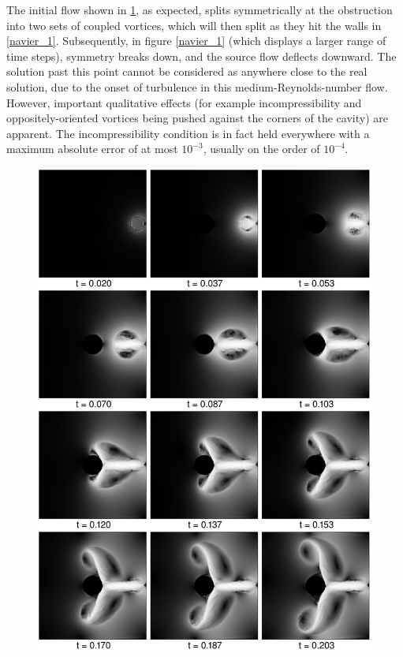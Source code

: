 The initial flow shown in \ref{navier_0}, as expected, splits symmetrically at the obstruction into two sets of coupled vortices, which will then split as they hit the walls in \ref{navier_1}.
Subsequently, in figure \ref{navier_1} (which displays a larger range of time steps), symmetry breaks down, and the source flow deflects downward.
The solution past this point cannot be considered as anywhere close to the real solution, due to the onset of turbulence in this medium-Reynolds-number flow. However, important qualitative effects
(for example incompressibility and oppositely-oriented vortices being pushed against the corners of the cavity) are apparent. The incompressibility condition is
in fact held everywhere with a maximum absolute error of at most $10^{-3}$, usually on the order of $10^{-4}$.

\begin{figure}[htbp]
    \includegraphics[width=\textwidth]{figures/navier_stokes/navier_0.png}
    \label{navier_0}
\end{figure}
